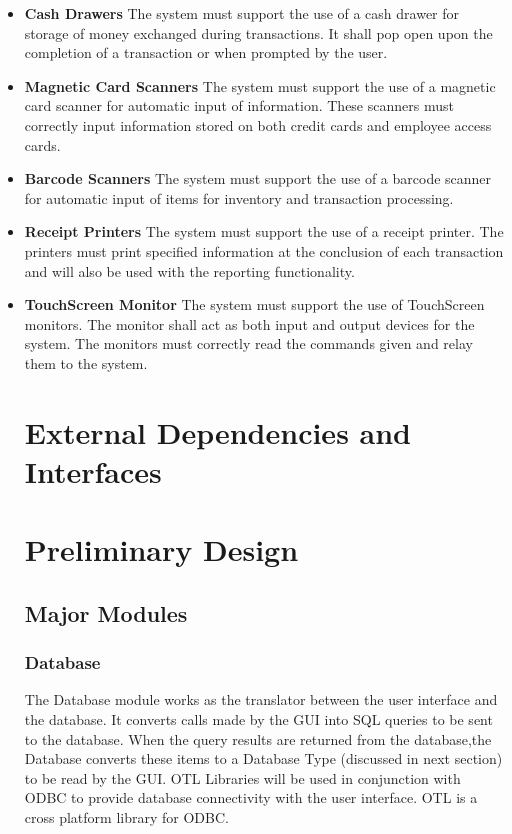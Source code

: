 \documentclass{report}
\begin{document}
        \begin{itemize}
	    \item {\bf Cash Drawers} The system must support the use of a
	    cash drawer for storage of money exchanged during transactions.
	    It shall pop open upon the completion of a transaction or when 
	    prompted by the user.

	    \item {\bf Magnetic Card Scanners} The system must support the use
	    of a magnetic card scanner for automatic input of information.  These
	    scanners must correctly input information stored on both credit cards
	    and employee access cards.

	    \item {\bf Barcode Scanners} The system must support the use of
	    a barcode scanner for automatic input of items for inventory
	    and transaction processing.

	    \item {\bf Receipt Printers} The system must support the use of
            a receipt printer.  The printers must print specified information
            at the conclusion of each transaction and will also be used with
	    the reporting functionality.

            \item {\bf TouchScreen Monitor} The system must support the use
            of TouchScreen monitors.  The monitor shall act as both input and
	    output devices for the system.  The monitors must correctly read 
            the commands given and relay them to the system.

\section{External Dependencies and Interfaces}

\section{Preliminary Design}

    \subsection{Major Modules}

        \subsubsection{Database}
        The Database module works as the translator between
        the user interface and the database.  It converts calls
        made by the GUI into SQL queries to be sent to the
        database.  When the query results are returned from the
        database,the Database converts these items to a
        Database Type (discussed in next section) to be read by the
        GUI. OTL Libraries will be used in conjunction with ODBC to
    provide database connectivity with the user interface. OTL is
    a cross platform library for ODBC.

\end{itemize}
\end{document}
